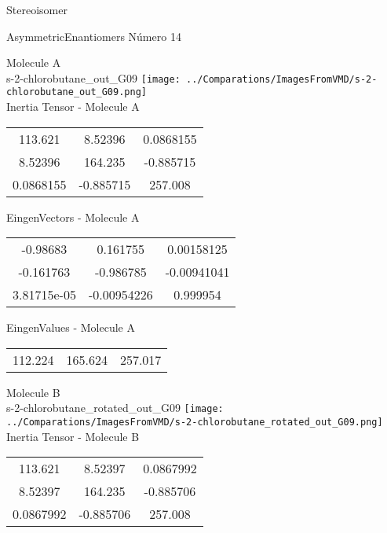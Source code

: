 \begin{center}
\vtab
\vtab
\textcolor{NavyBlue}{\Large Stereoisomer}
\end{center}

 \newpage

\vtab[-2cm]
\begin{center}
{\large AsymmetricEnantiomers \tab Número 14}
\end{center}
\begin{multicols}{2}
\begin{center}

Molecule A \\ 
s-2-chlorobutane\_out\_G09
\texttt{[image: ../Comparations/ImagesFromVMD/s-2-chlorobutane\_out\_G09.png]}
\\
Inertia Tensor - Molecule A \\
\vtab

\begin{tabular}{|c c c|}
113.621	 & 	8.52396	 & 	0.0868155	 \\
8.52396	 & 	164.235	 & 	-0.885715	 \\
0.0868155	 & 	-0.885715	 & 	257.008
\end{tabular}

\vtab
 EingenVectors - Molecule A     \\
\vtab
\begin{tabular}{|c c c|}
-0.98683	 & 	0.161755	 & 	0.00158125	 \\
-0.161763	 & 	-0.986785	 & 	-0.00941041	 \\
3.81715e-05	 & 	-0.00954226	 & 	0.999954
\end{tabular}

\vtab
 EingenValues - Molecule A     \\
\vtab
\begin{tabular}{|c c c|}
112.224	 & 	165.624	 & 	257.017	 \\
\end{tabular}
\columnbreak

Molecule B \\ 
s-2-chlorobutane\_rotated\_out\_G09
\texttt{[image: ../Comparations/ImagesFromVMD/s-2-chlorobutane\_rotated\_out\_G09.png]}
\\
Inertia Tensor - Molecule B \\
\vtab

\begin{tabular}{|c c c|}
113.621	 & 	8.52397	 & 	0.0867992	 \\
8.52397	 & 	164.235	 & 	-0.885706	 \\
0.0867992	 & 	-0.885706	 & 	257.008
\end{tabular}


\end{center}
\end{multicols}

